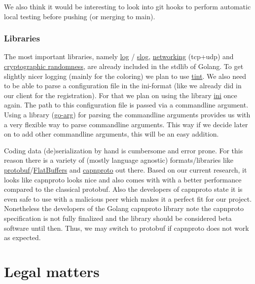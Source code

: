 \documentclass[a4paper,english,10pt,NET]{tumarticle}
\begin{document}
We also think it would be interesting to look into git hooks to perform automatic local testing before pushing (or merging to main).



\subsubsection{Libraries}
The most important libraries, namely
\href{https://pkg.go.dev/log}{log}
/
\href{https://pkg.go.dev/log/slog@go1.22.2}{slog},
\href{https://pkg.go.dev/net}{networking} (tcp+udp)
and
\href{https://pkg.go.dev/crypto/rand}{cryptographic randomness},
are already included in the stdlib of Golang.
To get slightly nicer logging (mainly for the coloring) we plan to use \href{github.com/lmittmann/tint}{tint}.
We also need to be able to parse a configuration file in the ini-format (like we already did in our client for the registration).
For that we plan on using the library \href{gopkg.in/ini.v1}{ini} once again.
The path to this configuration file is passed via a commandline argument.
Using a library (\href{https://github.com/alexflint/go-arg}{go-arg}) for parsing the commandline arguments provides us with a very flexible way to parse commandline arguments.
This way if we decide later on to add other commandline arguments, this will be an easy addition.

Coding data (de)serialization by hand is cumbersome and error prone.
For this reason there is a variety of (mostly language agnostic) formats/libraries like \href{https://protobuf.dev/}{protobuf}/\href{https://flatbuffers.dev/}{FlatBuffers} and \href{https://capnproto.org/}{capnproto} out there.
Based on our current research, it looks like capnproto looks nice and also comes with with a better performance compared to the classical protobuf.
Also the developers of capnproto state it is even safe to use with a malicious peer which makes it a perfect fit for our project.
Nonetheless the developers of the Golang capnproto library note the capnproto specification is not fully finalized and the library should be considered beta software until then.
Thus, we may switch to protobuf if capnproto does not work as expected.

\section{Legal matters}
\end{document}

